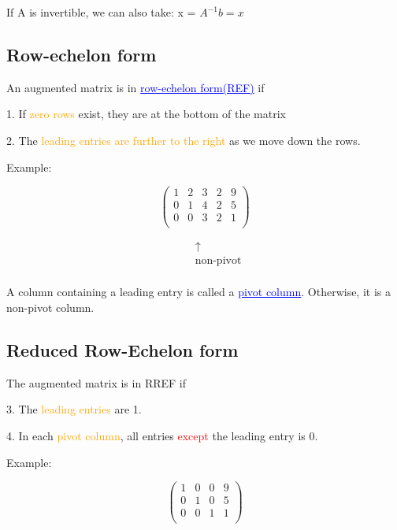 \documentclass{article}
\newcommand{\bul}[1]{\textcolor{blue}{\underline{#1}}}
\begin{document}
If A is invertible, we can also take: x = $A^{-1}b = x$

\subsection{Row-echelon form}
An augmented matrix is in \bul{row-echelon form(REF)} if

1. If \textcolor{orange}{zero rows} exist, they are at the bottom of the matrix

2. The \textcolor{orange}{leading entries are further to the right} as we move down the rows.

\vspace{10pt}

Example:

\[
\left( 
\begin{array}{cccc|c}
1 & 2 & 3 & 2 & 9 \\
0 & 1 & 4 & 2 & 5 \\
0 & 0 & 3 & 2 & 1 \\
\end{array}
\right)
\]

\[
\begin{array}{ccccc}
    & & & \hspace{10pt} \uparrow  & \\    
    & & & \hspace{10pt} \text{non-pivot}  & \\    
\end{array}
\]


A column containing a leading entry is called a \bul{pivot column}. Otherwise, it is a non-pivot column.

\subsection{Reduced Row-Echelon form}
The augmented matrix is in RREF if

3. The \textcolor{orange}{leading entries} are 1.

4. In each \textcolor{orange}{pivot column}, all entries \textcolor{red}{except} the leading entry is 0.

\vspace{10pt}

Example: 

\[
\left( 
\begin{array}{ccc|c}
1 & 0 & 0 & 9 \\
0 & 1 & 0 & 5 \\
0 & 0 & 1 & 1 \\
\end{array}
\right)
\]
\end{document}
